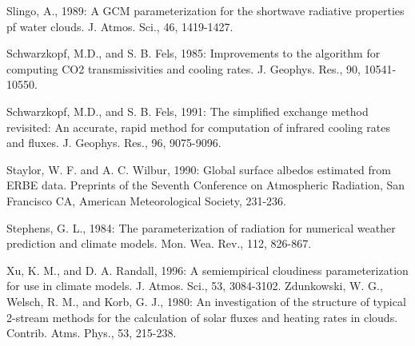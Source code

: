 Slingo, A., 1989\+: A G\+CM parameterization for the shortwave radiative properties pf water clouds. J. Atmos. Sci., 46, 1419-\/1427.

Schwarzkopf, M.\+D., and S. B. Fels, 1985\+: Improvements to the algorithm for computing C\+O2 transmissivities and cooling rates. J. Geophys. Res., 90, 10541-\/10550.

Schwarzkopf, M.\+D., and S. B. Fels, 1991\+: The simplified exchange method revisited\+: An accurate, rapid method for computation of infrared cooling rates and fluxes. J. Geophys. Res., 96, 9075-\/9096.

Staylor, W. F. and A. C. Wilbur, 1990\+: Global surface albedos estimated from E\+R\+BE data. Preprints of the Seventh Conference on Atmospheric Radiation, San Francisco CA, American Meteorological Society, 231-\/236.

Stephens, G. L., 1984\+: The parameterization of radiation for numerical weather prediction and climate models. Mon. Wea. Rev., 112, 826-\/867.

Xu, K. M., and D. A. Randall, 1996\+: A semiempirical cloudiness parameterization for use in climate models. J. Atmos. Sci., 53, 3084-\/3102. Zdunkowski, W. G., Welsch, R. M., and Korb, G. J., 1980\+: An investigation of the structure of typical 2-\/stream methods for the calculation of solar fluxes and heating rates in clouds. Contrib. Atms. Phys., 53, 215-\/238. 